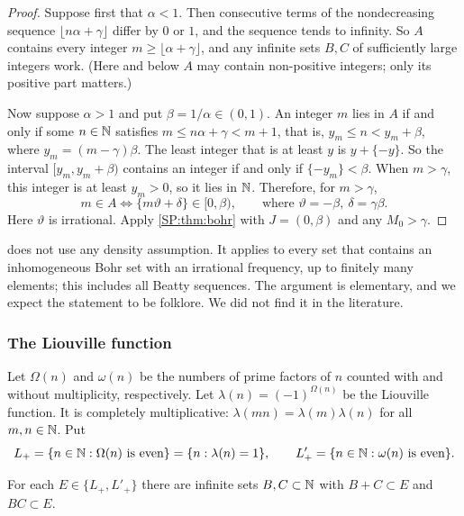 \begin{proof}
Suppose first that $\alpha<1$. Then consecutive terms of the nondecreasing sequence
$\lfloor n\alpha+\gamma\rfloor$ differ by $0$ or $1$, and the sequence tends to infinity. So $A$
contains every integer $m\ge\lfloor\alpha+\gamma\rfloor$, and any infinite sets $B,C$ of
sufficiently large integers work. (Here and below $A$ may contain non-positive integers; only
its positive part matters.)

Now suppose $\alpha>1$ and put $\beta=1/\alpha\in(0,1)$. An integer $m$ lies in $A$ if and only
if some $n\in\mathbb{N}$ satisfies $m\le n\alpha+\gamma<m+1$, that is, $y_m\le n<y_m+\beta$, where
$y_m=(m-\gamma)\beta$. The least integer that is at least $y$ is $y+\{-y\}$. So the interval
$[y_m,y_m+\beta)$ contains an integer if and only if $\{-y_m\}<\beta$. When $m>\gamma$, this
integer is at least $y_m>0$, so it lies in $\mathbb{N}$. Therefore, for $m>\gamma$,
\[
m\in A\iff \{m\vartheta+\delta\}\in[0,\beta),\qquad\text{where }\vartheta=-\beta,\ \delta=\gamma\beta .
\]
Here $\vartheta$ is irrational. Apply \cref{SP:thm:bohr} with $J=(0,\beta)$ and any
$M_0>\gamma$.
\end{proof}

\begin{remark}\label{SP:rem:bohr}
 does not use any density assumption. It applies to every set that contains an
inhomogeneous Bohr set with an irrational frequency, up to finitely many elements; this includes
all Beatty sequences. The argument is elementary, and we expect the statement to be folklore. We
did not find it in the literature.
\end{remark}

\subsubsection{The Liouville function}

Let $\Omega(n)$ and $\omega(n)$ be the numbers of prime factors of $n$ counted with and
without multiplicity, respectively. Let $\lambda(n)=(-1)^{\Omega(n)}$ be the Liouville function.
It is completely multiplicative: $\lambda(mn)=\lambda(m)\lambda(n)$ for all $m,n\in\mathbb{N}$. Put
\[
L_+=\{n\in\mathbb{N}:\Omega(n)\text{ is even}\}=\{n:\lambda(n)=1\},\qquad
L'_+=\{n\in\mathbb{N}:\omega(n)\text{ is even}\}.
\]

\begin{theorem}\label{SP:thm:liouville}
For each $E\in\{L_+,L'_+\}$ there are infinite sets $B,C\subset\mathbb{N}$ with $B+C\subset E$ and
$BC\subset E$.
\end{theorem}

